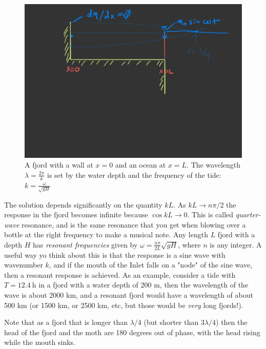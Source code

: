 \begin{figure}[hbt]
  \begin{center}
    \includegraphics{figs/Waves/SketchFjord}
    \caption{A fjord with a wall at $x=0$ and an ocean at $x=L$.  The wavelength $\lambda=\frac{2\pi}{k}$ is set by the water depth and the frequency of the tide: $k=\frac{\omega}{\sqrt{gH}} $}
    \label{fig:SketchFjord}  
  \end{center}
\end{figure}

The solution depends significantly on the quantity $kL$.  As $kL\to n \pi/2$ the response in the fjord becomes infinite because $\cos kL \to 0$.  This is called \emph{quarter-wave} resonance, and is the same resonance that you get when blowing over a bottle at the right frequency to make a musical note. Any length $L$ fjord with a depth $H$ has \emph{resonant frequencies} given by $\omega = \frac{n\pi}{2L}\sqrt{gH}$, where $n$ is any integer.  A useful way yo think about this is that the response is a sine wave with wavenumber $k$, and if the mouth of the Inlet falls on a "node" of the sine wave, then a resonant response is achieved.  As an example, consider a tide with $T=12.4\ \mathrm{h}$ in a fjord with a water depth of 200 m, then the wavelength of the wave is about 2000 km, and a resonant fjord would have a wavelength of about 500 km (or 1500 km, or 2500 km, etc, but those would be \emph{very} long fjords!).  
 
 Note that as a fjord that is longer than $\lambda/4$ (but shorter than $3\lambda/4$) then the head of the fjord and the moth are 180 degrees out of phase, with the head rising while the mouth sinks.  
 
